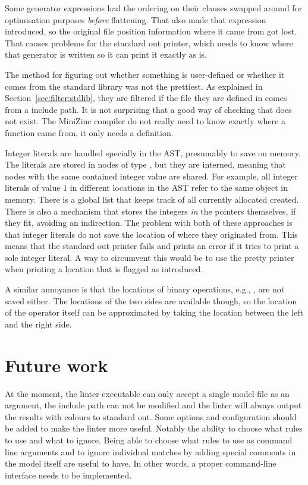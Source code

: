 \documentclass[a4paper,12pt]{article}
\begin{document}
Some generator expressions had the ordering on their  clauses swapped around for
optimisation purposes \emph{before} flattening. That also made that expression introduced,
so the original file position information where it came from got lost. That causes
problems for the standard out printer, which needs to know where that generator is written
so it can print it exactly as is.

The method for figuring out whether something is user-defined or whether it comes from the
standard library was not the prettiest. As explained in Section~\ref{sec:filter:stdlib},
they are filtered if the file they are defined in comes from a include path. It is not
surprising that a good way of checking that does not exist. The MiniZinc compiler do not
really need to know exactly where a function came from, it only needs a definition.

Integer literals are handled specially in the AST, presumably to save on memory. The
literals are stored in nodes of type , but they are interned, meaning that
nodes with the same contained integer value are shared. For example, all integer literals
of value $1$ in different locations in the AST refer to the same object in memory. There
is a global list that keeps track of all currently allocated  created. There is
also a mechanism that stores the integers \emph{in} the pointers themselves, if they fit,
avoiding an indirection. The problem with both of these approaches is that integer
literals do not save the location of where they originated from. This means that the
standard out printer fails and prints an error if it tries to print a sole integer
literal. A way to circumvent this would be to use the pretty printer when printing a
location that is flagged as introduced.

A similar annoyance is that the locations of binary operations, e.g., \mi{/\\}, are not
saved either. The locations of the two sides are available though, so the location of the
operator itself can be approximated by taking the location between the left and the right
side.

\section{Future work}
At the moment, the linter executable can only accept a single model-file as an argument,
the include path can not be modified and the linter will always output the results with
colours to standard out.
Some options and configuration should be added to make the linter more useful. Notably
the ability to choose what rules to use and what to ignore. Being able to choose what
rules to use as command line arguments and to ignore individual matches by adding special
comments in the model itself are useful to have. In other words, a proper command-line
interface needs to be implemented.
\end{document}
